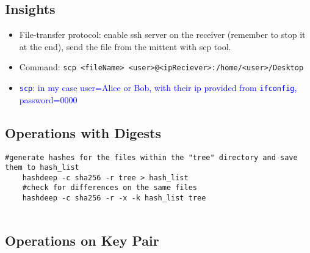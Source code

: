 \subsection*{Insights}
\begin{itemize}
	\item File-transfer protocol: enable ssh server on the receiver (remember to stop it at the end), send the file from the mittent with scp tool.
	\item Command: \texttt{scp <fileName> <user>@<ipReciever>:/home/<user>/Desktop}
	\item \textcolor{Blue}{\texttt{scp}: in my case user=Alice or Bob, with their ip provided from \texttt{ifconfig}, password=0000}
\end{itemize}

\subsection*{Operations with Digests}

\begin{lstlisting}[style=bashStyle]
	#generate hashes for the files within the "tree" directory and save them to hash_list
	hashdeep -c sha256 -r tree > hash_list
	#check for differences on the same files
	hashdeep -c sha256 -r -x -k hash_list tree
	
\end{lstlisting}


\clearpage

\subsection*{Operations on Key Pair}

